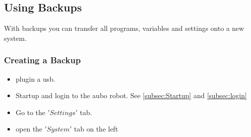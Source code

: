 \documentclass{article}
\begin{document}
\subsection{Using Backups} 
With backups you can transfer all programs, variables and settings onto a new system. 

\subsubsection{Creating a Backup}
\begin{itemize}
\item plugin a usb. 
\item Startup and login to the aubo robot. See \ref{subsec:Startup} and \ref{subsec:login}
\item Go to the $'Settings'$ tab.
\begin{center}
\end{center}
\item open the $'System'$ tab on the left
\begin{center}

\end{center}
\end{itemize}
\end{document}
